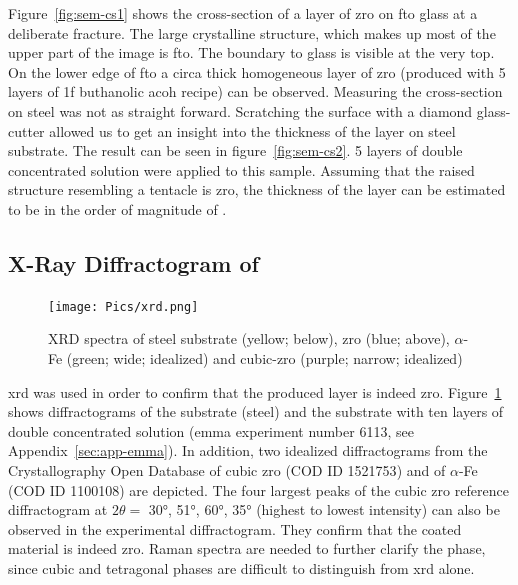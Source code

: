 Figure~\ref{fig:sem-cs1} shows the cross-section of a layer of \gls{zro} on \gls{fto} glass at a deliberate fracture.
The large crystalline structure, which makes up most of the upper part of the image is \gls{fto}. 
The boundary to glass is visible at the very top. 
On the lower edge of \gls{fto} a circa  thick homogeneous layer of \gls{zro} (produced with 5 layers of \gls{1f} buthanolic \gls{acoh} recipe) can be observed.
Measuring the cross-section on steel was not as straight forward. 
Scratching the surface with a diamond glass-cutter allowed us to get an insight into the thickness of the layer on steel substrate.
%
The result can be seen in figure~\ref{fig:sem-cs2}. 
5 layers of double concentrated solution were applied to this sample. 
Assuming that the raised structure resembling a tentacle is \gls{zro}, 
the thickness of the layer can be estimated to be in the order of magnitude of .

\subsection{X-Ray Diffractogram of }
\begin{figure}
	\centering
	\texttt{[image: Pics/xrd.png]}
	\caption{XRD spectra of steel substrate (yellow; below), \gls{zro} (blue; above), $\alpha$-Fe (green; wide; idealized) and cubic-\gls{zro} (purple; narrow; idealized)\cite{gkatz1971xray} }%
	\label{fig:xrd}
\end{figure}

\Gls{xrd} was used in order to confirm that the produced layer is indeed \gls{zro}. 
Figure~\ref{fig:xrd} shows diffractograms of the substrate (steel) and 
the substrate with ten layers of double concentrated solution (\gls{emma} experiment number 6113, see Appendix~\ref{sec:app-emma}).
In addition, two idealized diffractograms from the Crystallography Open Database of cubic \gls{zro} (COD ID 1521753\cite{gkatz1971xray}) and of $\alpha$-Fe (COD ID 1100108) are depicted.
%
The four largest peaks of the cubic \gls{zro} reference diffractogram at $2\theta=$ \ang{30}, \ang{51}, \ang{60}, \ang{35} (highest to lowest intensity) can also be observed in the experimental diffractogram. %
They confirm that the coated material is indeed \gls{zro}.
Raman spectra are needed to further clarify the phase, 
since cubic and tetragonal phases are difficult to distinguish from \gls{xrd} alone\cite{Purohit2006Combustion}.

